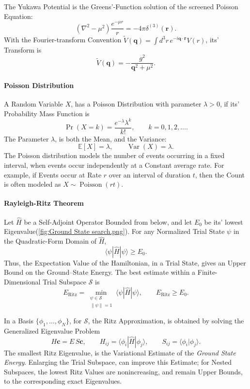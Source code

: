 \documentclass[a4paper, 10pt, onepage]{elegantbook}
\begin{document}
{The Yukawa Potential is the Greens'-Function solution of the screened Poisson Equation:
\[
\left(\nabla^2-\mu^2\right)
\frac{e^{-\mu r}}{r}
=
-4\pi\delta^{(3)}(\mathbf{r}).
\]
With the Fourier-transform Convention
$\widetilde{V}(\mathbf{q})=\int d^3r\,e^{-i\mathbf{q}\cdot\mathbf{r}}V(r)$, its' Transform is
\[
\widetilde{V}(\mathbf{q})
=
-\frac{g^2}{\mathbf{q}^2+\mu^2}.
\]

\paragraph{Poisson Distribution}

\noindent

A Random Variable $X$, has a Poisson Distribution with parameter
$\lambda>0$, if its' Probability Mass Function is
\[
\Pr(X=k)=\frac{e^{-\lambda}\lambda^k}{k!},
\qquad k=0,1,2,\ldots.
\]
The Parameter $\lambda$, is both the Mean, and the Variance:
\[
\mathbb{E}[X]=\lambda,
\qquad
\operatorname{Var}(X)=\lambda.
\]
The Poisson distribution models the number of events occurring in a fixed interval, 
when events occur independently at a Constant average rate. For example, if Events occur at Rate $r$ over an interval 
of duration $t$, 
then the Count is often modeled as $X\sim\operatorname{Poisson}(rt)$.

\paragraph{Rayleigh-Ritz Theorem}

\noindent

Let $\hat{H}$ be a Self-Adjoint Operator Bounded from below, and let $E_0$ be its' lowest Eigenvalue(\ref{fig:Ground 
State search.png}). 
 For any Normalized Trial State $\psi$ in the Quadratic-Form Domain of $\hat{H}$,
\[
\langle \psi|\hat{H}|\psi\rangle \ge E_0.
\]
Thus, the Expectation Value of the Hamiltonian, in a Trial State, gives an Upper Bound on the Ground--State Energy. 
The best estimate within a Finite-Dimensional Trial Subspace $\mathcal{S}$ is
\[
E_{\mathrm{Ritz}}
=
\min_{\substack{\psi\in\mathcal{S}\\ \|\psi\|=1}}
\langle \psi|\hat{H}|\psi\rangle,
\qquad
E_{\mathrm{Ritz}}\ge E_0.
\]

In a Basis $\{\phi_1,\ldots,\phi_N\}$, for $\mathcal{S}$, the Ritz Approximation, 
is obtained by solving the Generalized Eigenvalue Problem\index{}
\[
H\mathbf{c}=E\,S\mathbf{c},
\qquad
H_{ij}=\langle\phi_i|\hat{H}|\phi_j\rangle,
\qquad
S_{ij}=\langle\phi_i|\phi_j\rangle.
\]
The smallest Ritz Eigenvalue, is the Variational Estimate of the \emph{Ground State Energy}. 
Enlarging the Trial Subspace, can improve this Estimate;
for Nested Subspaces, the lowest Ritz Values are nonincreasing, and remain Upper Bounds, to the corresponding exact 
Eigenvalues.

}
\end{document}
